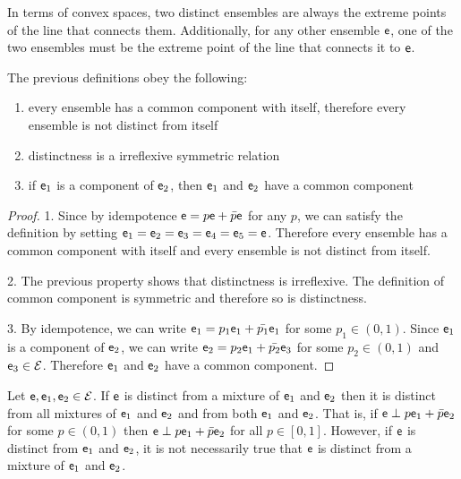 \begin{remark}
	In terms of convex spaces, two distinct ensembles are always the extreme points of the line that connects them. Additionally, for any other ensemble $\mathsf{e}$, one of the two ensembles must be the extreme point of the line that connects it to $\mathsf{e}$.
\end{remark}

\begin{coro}
	The previous definitions obey the following:
	\begin{enumerate}
		\item every ensemble has a common component with itself, therefore every ensemble is not distinct from itself
		\item distinctness is a irreflexive symmetric relation
		\item if $\mathsf{e}_1$ is a component of $\mathsf{e}_2$, then $\mathsf{e}_1$ and $\mathsf{e}_2$ have a common component
	\end{enumerate}
\end{coro}

\begin{proof}
	1. Since by idempotence $\mathsf{e} = p \mathsf{e} + \bar{p} \mathsf{e}$ for any $p$, we can satisfy the definition by setting $\mathsf{e}_1 = \mathsf{e}_2 = \mathsf{e}_3 = \mathsf{e}_4 = \mathsf{e}_5 = \mathsf{e}$. Therefore every ensemble has a common component with itself and every ensemble is not distinct from itself.
	
	2. The previous property shows that distinctness is irreflexive. The definition of common component is symmetric and therefore so is distinctness.
	
	3. By idempotence, we can write $\mathsf{e}_1 = p_1 \mathsf{e}_1 + \bar{p_1} \mathsf{e}_1$ for some $p_1 \in (0,1)$. Since $\mathsf{e}_1$ is a component of $\mathsf{e}_2$, we can write $\mathsf{e}_2 = p_2 \mathsf{e}_1 + \bar{p_2} \mathsf{e}_3$ for some $p_2 \in (0, 1)$ and $\mathsf{e}_3 \in \mathcal{E}$. Therefore $\mathsf{e}_1$ and $\mathsf{e}_2$ have a common component.
\end{proof}

\begin{prop}
	Let $\mathsf{e},\mathsf{e}_1,\mathsf{e}_2 \in \mathcal{E}$. If $\mathsf{e}$ is distinct from a mixture of $\mathsf{e}_1$ and $\mathsf{e}_2$ then it is distinct from all mixtures of $\mathsf{e}_1$ and $\mathsf{e}_2$ and from both $\mathsf{e}_1$ and $\mathsf{e}_2$. That is, if $\mathsf{e} \perp p \mathsf{e}_1 + \bar{p} \mathsf{e}_2$ for some $p \in (0, 1)$ then $\mathsf{e} \perp p \mathsf{e}_1 + \bar{p} \mathsf{e}_2$ for all $p \in [0, 1]$. However, if $\mathsf{e}$ is distinct from $\mathsf{e}_1$ and $\mathsf{e}_2$, it is not necessarily true that $\mathsf{e}$ is distinct from a mixture of $\mathsf{e}_1$ and $\mathsf{e}_2$.
\end{prop}

